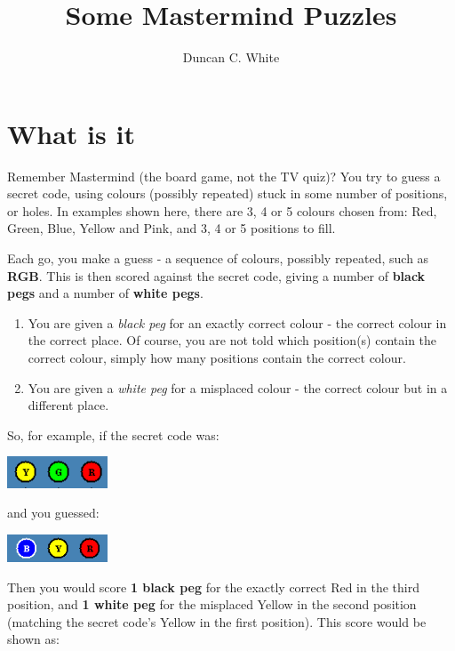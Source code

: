\documentclass{article}
\title { Some Mastermind Puzzles }
\author{Duncan C. White}
\begin{document}
\maketitle

\renewcommand{\baselinestretch}{0.5}

\section*{What is it}

Remember Mastermind (the board game, not the TV quiz)?  You try to guess
a secret code, using colours (possibly repeated) stuck in some number of
positions, or holes.
In examples shown here, there are 3, 4 or 5 colours chosen from:
Red, Green, Blue, Yellow and Pink, and 3, 4 or 5 positions to fill.

Each go, you make a guess - a sequence of colours, possibly repeated, such
as {\bf RGB}.
This is then scored against the secret code, giving a number of {\bf black pegs} and a number of {\bf white pegs}.

\begin{enumerate}
\item
You are given a {\em black peg} for an exactly correct colour - the
correct colour in the correct place.  Of course, you are not told
which position(s) contain the correct colour, simply how many positions
contain the correct colour.

\item
You are given a {\em white peg} for a misplaced colour - the correct
colour but in a different place.

\end{enumerate}

\par\noindent
So, for example, if the secret code was:

\includegraphics[width=3cm]{secret.png}

\par\noindent
and you guessed:

\includegraphics[width=3cm]{guess.png}

\par\noindent
Then you would score {\bf 1 black peg} for the exactly correct Red in the third
position, and {\bf 1 white peg} for the misplaced Yellow in the second position
(matching the secret code's Yellow in the first position).  This score would be shown as:
\end{document}
